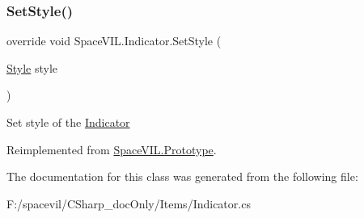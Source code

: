 \mbox{\label{class_space_v_i_l_1_1_indicator_aa9233e9dda656a3634bcc3ace59c00dc}} 
\subsubsection{\texorpdfstring{Set\+Style()}{SetStyle()}}
{\footnotesize\ttfamily override void Space\+V\+I\+L.\+Indicator.\+Set\+Style (\begin{DoxyParamCaption}\item[{\mbox{\hyperlink{class_space_v_i_l_1_1_decorations_1_1_style}{Style}}}]{style }\end{DoxyParamCaption})\hspace{0.3cm}{\ttfamily [virtual]}}



Set style of the \mbox{\hyperlink{class_space_v_i_l_1_1_indicator}{Indicator}} 



Reimplemented from \mbox{\hyperlink{class_space_v_i_l_1_1_prototype_ae96644a6ace490afb376fb542161e541}{Space\+V\+I\+L.\+Prototype}}.



The documentation for this class was generated from the following file\+:\begin{DoxyCompactItemize}
\item 
F\+:/spacevil/\+C\+Sharp\+\_\+doc\+Only/\+Items/Indicator.\+cs\end{DoxyCompactItemize}
